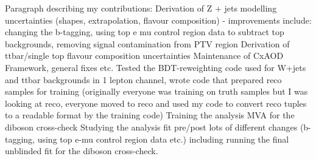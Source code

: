 Paragraph describing my contributions:
Derivation of Z + jets modelling uncertainties (shapes, extrapolation, flavour
composition)
 - improvements include: changing the b-tagging, using top e mu control region
 data to subtract top backgrounds, removing signal contamination from PTV region
Derivation of ttbar/single top flavour composition uncertainties
Maintenance of CxAOD Framework, general fixes etc.
Tested the BDT-reweighting code used for W+jets and ttbar backgrounds in 1
lepton channel, wrote code that prepared reco samples for training (originally
everyone was training on truth samples but I was looking at reco, everyone moved
to reco and used my code to convert reco tuples to a readable format by the
training code)
Training the analysis MVA for the diboson cross-check
Studying the analysis fit pre/post lots of different changes (b-tagging, using
top e-mu control region data etc.) including running the final unblinded fit for
the diboson cross-check.
